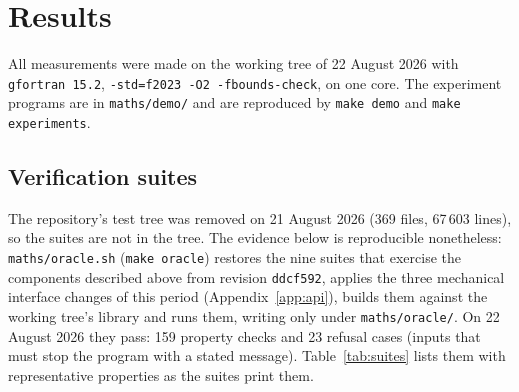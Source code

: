 \documentclass[11pt,a4paper]{article}
\newcommand{\code}[1]{\texttt{#1}}
\begin{document}
\section{Results}\label{sec:results}

All measurements were made on the working tree of 22 August 2026 with \code{gfortran 15.2}, \code{-std=f2023 -O2 -fbounds-check}, on one core. The experiment programs are in \code{maths/demo/} and are reproduced by \code{make demo} and \code{make experiments}.

\subsection{Verification suites}

The repository's test tree was removed on 21 August 2026 (369 files, 67\,603 lines), so the suites are not in the tree. The evidence below is reproducible nonetheless: \code{maths/oracle.sh} (\code{make oracle}) restores the nine suites that exercise the components described above from revision \code{ddcf592}, applies the three mechanical interface changes of this period (Appendix~\ref{app:api}), builds them against the working tree's library and runs them, writing only under \code{maths/oracle/}. On 22 August 2026 they pass: 159 property checks and 23 refusal cases (inputs that must stop the program with a stated message). Table~\ref{tab:suites} lists them with representative properties as the suites print them.
\end{document}
